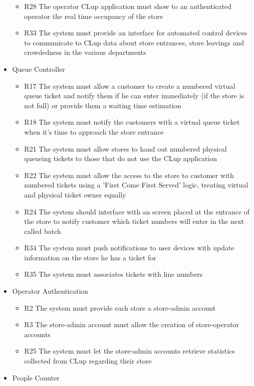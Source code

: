 \begin{itemize}
\begin{itemize}
        \item R28 The operator CLup application must show to an authenticated operator the real time occupancy of the store
        \item R33 The system must provide an interface for automated control devices to communicate to CLup data about store entrances, store leavings and crowdedness in the various departments
    \end{itemize}
    \item Queue Controller
    \begin{itemize}
        \item R17 The system must allow a customer to create a numbered virtual queue ticket and notify them if he can enter immediately (if the store is not full) or provide them a waiting time estimation
        \item R18 The system must notify the customers with a virtual queue ticket when it’s time to approach the store entrance
        \item R21 The system must allow stores to hand out numbered physical queueing tickets to those that do not use the CLup application
        \item R22 The system must allow the access to the store to customer with numbered tickets using a ’First Come First Served’ logic, treating virtual and physical ticket owner equally
        \item R24 The system should interface with an screen placed at the entrance of the store to notify customer which ticket numbers will enter in the next called batch
        \item R34 The system must push notifications to user devices with update information on the store he has a ticket for
        \item R35 The system must associates tickets with line numbers
    \end{itemize}
    \item Operator Authentication
    \begin{itemize}
        \item R2 The system must provide each store a store-admin account
        \item R3 The store-admin account must allow the creation of store-operator accounts
        \item R25 The system must let the store-admin accounts retrieve statistics collected from CLup regarding their store
    \end{itemize}
    \item People Counter

\end{itemize}
